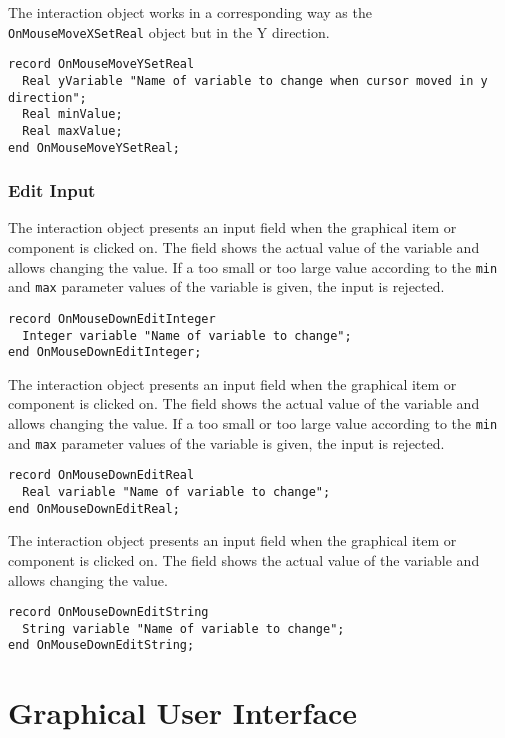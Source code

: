 The  interaction object works in a corresponding way as the \lstinline!OnMouseMoveXSetReal! object but in the Y direction.
\begin{lstlisting}[language=modelica]
record OnMouseMoveYSetReal
  Real yVariable "Name of variable to change when cursor moved in y direction";
  Real minValue;
  Real maxValue;
end OnMouseMoveYSetReal;
\end{lstlisting}

\subsubsection{Edit Input}\label{edit-input}

The  interaction object presents an input field when the graphical item or component is clicked on.
The field shows the actual value of the variable and allows changing the value.
If a too small or too large value according to the \lstinline!min! and \lstinline!max! parameter values of the variable is given, the input is rejected.
\begin{lstlisting}[language=modelica]
record OnMouseDownEditInteger
  Integer variable "Name of variable to change";
end OnMouseDownEditInteger;
\end{lstlisting}

The  interaction object presents an input field when the graphical item or component is clicked on.
The field shows the actual value of the variable and allows changing the value.
If a too small or too large value according to the \lstinline!min! and \lstinline!max! parameter values of the variable is given, the input is rejected.
\begin{lstlisting}[language=modelica]
record OnMouseDownEditReal
  Real variable "Name of variable to change";
end OnMouseDownEditReal;
\end{lstlisting}

The  interaction object presents an input field when the graphical item or component is clicked on.
The field shows the actual value of the variable and allows changing the value.
\begin{lstlisting}[language=modelica]
record OnMouseDownEditString
  String variable "Name of variable to change";
end OnMouseDownEditString;
\end{lstlisting}


\section{Graphical User Interface}\label{annotations-for-the-graphical-user-interface}\label{graphical-user-interface}

